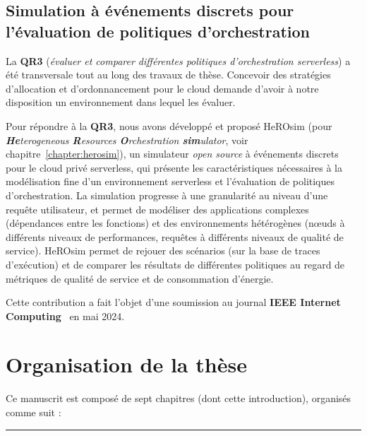 \subsection{Simulation à événements discrets pour l'évaluation de politiques d'orchestration}


La \textbf{QR3} (\textit{évaluer et comparer différentes politiques d'orchestration serverless}) a été transversale tout au long des travaux de thèse. Concevoir des stratégies d'allocation et d'ordonnancement pour le cloud demande d'avoir à notre disposition un environnement dans lequel les évaluer.

Pour répondre à la \textbf{QR3}, nous avons développé et proposé HeROsim (pour \textit{\textbf{He}terogeneous \textbf{R}esources \textbf{O}rchestration \textbf{sim}ulator}, voir chapitre~\ref{chapter:herosim}), un simulateur \textit{open source} à événements discrets pour le cloud privé serverless, qui présente les caractéristiques nécessaires à la modélisation fine d'un environnement serverless et l'évaluation de politiques d'orchestration. La simulation progresse à une granularité au niveau d'une requête utilisateur, et permet de modéliser des applications complexes (dépendances entre les fonctions) et des environnements hétérogènes (nœuds à différents niveaux de performances, requêtes à différents niveaux de qualité de service). HeROsim permet de rejouer des scénarios (sur la base de traces d'exécution) et de comparer les résultats de différentes politiques au regard de métriques de qualité de service et de consommation d'énergie.

Cette contribution a fait l'objet d'une soumission au journal \textbf{IEEE Internet Computing}~\cite{herosim} en mai 2024.

\clearpage

\section{Organisation de la thèse}

Ce manuscrit est composé de sept chapitres (dont cette introduction), organisés comme suit :

\begin{center}
    \rule{4cm}{0.4pt}
\end{center}


